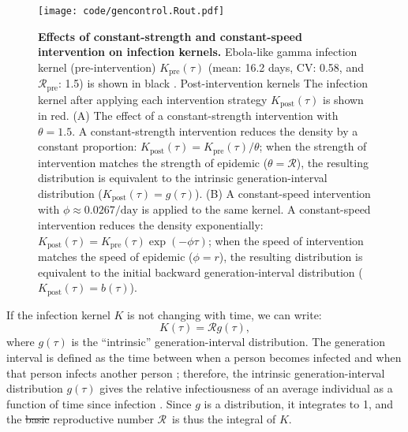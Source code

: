 \documentclass[12pt]{article}
\newcommand{\RR}{\ensuremath{{\mathcal R}}}
\newcommand{\Rx}[1]{\ensuremath{\RR_{\mathrm{#1}}}}
\newcommand{\Rpre}{\Rx{pre}}
\newcommand{\Ro}{\Rx{0}}
\newcommand{\KK}{\ensuremath{{K}}}
\newcommand{\Kx}[1]{\ensuremath{\KK_{\mathrm{#1}}}}
\newcommand{\Kpre}{\Kx{pre}}
\newcommand{\Kpost}{\Kx{post}}
\newcommand{\rr}{\ensuremath{{r}}}
\newcommand{\rx}[1]{\ensuremath{\rr_{\mathrm{#1}}}}
\newcommand{\rpre}{\rx{pre}}
\newcommand{\figlab}[1]{\label{fig:#1}}
\newcommand{\eqlab}[1]{\label{eq:#1}}
\providecommand{\DIFaddtex}[1]{{\protect\color{blue}\uwave{#1}}} %
\providecommand{\DIFdeltex}[1]{{\protect\color{red}\sout{#1}}}                      %
\providecommand{\DIFdelbegin}{} %
\providecommand{\DIFdelend}{} %
\providecommand{\DIFaddFL}[1]{\DIFadd{#1}} %
\providecommand{\DIFdelFL}[1]{\DIFdel{#1}} %
\providecommand{\DIFaddbeginFL}{} %
\providecommand{\DIFaddendFL}{} %
\providecommand{\DIFdelbeginFL}{} %
\providecommand{\DIFdelendFL}{} %
\providecommand{\DIFadd}[1]{\texorpdfstring{\DIFaddtex{#1}}{#1}} %
\providecommand{\DIFdel}[1]{\texorpdfstring{\DIFdeltex{#1}}{}} %
\newcommand{\DIFscaledelfig}{0.5}
\newlength{\DIFdelgraphicswidth} %
\newlength{\DIFdelgraphicsheight} %
\newcommand{\DIFaddincludegraphics}[2][]{{\color{blue}\fbox{\DIFOincludegraphics[#1]{#2}}}} %
\newcommand{\DIFdelincludegraphics}[2][]{%
\sbox{\DIFdelgraphicsbox}{\DIFOincludegraphics[#1]{#2}}%
\settoboxwidth{\DIFdelgraphicswidth}{\DIFdelgraphicsbox} %
\settoboxtotalheight{\DIFdelgraphicsheight}{\DIFdelgraphicsbox} %
\scalebox{\DIFscaledelfig}{%
\parbox[b]{\DIFdelgraphicswidth}{\usebox{\DIFdelgraphicsbox}\\[-\baselineskip] \rule{\DIFdelgraphicswidth}{0em}}\llap{\resizebox{\DIFdelgraphicswidth}{\DIFdelgraphicsheight}{%
\setlength{\unitlength}{\DIFdelgraphicswidth}%
\begin{picture}(1,1)%
\thicklines\linethickness{2pt} %
{\color[rgb]{1,0,0}\put(0,0){\framebox(1,1){}}}%
{\color[rgb]{1,0,0}\put(0,0){\line( 1,1){1}}}%
{\color[rgb]{1,0,0}\put(0,1){\line(1,-1){1}}}%
\end{picture}%
}\hspace*{3pt}}} %
} %
\DeclareRobustCommand{\DIFdelbegin}{\DIFOdelbegin \let\includegraphics\DIFdelincludegraphics} %
\DeclareRobustCommand{\DIFdelend}{\DIFOaddend \let\includegraphics\DIFOincludegraphics} %
\DeclareRobustCommand{\DIFaddbeginFL}{\DIFOaddbeginFL \let\includegraphics\DIFaddincludegraphics} %
\DeclareRobustCommand{\DIFaddendFL}{\DIFOaddendFL \let\includegraphics\DIFOincludegraphics} %
\DeclareRobustCommand{\DIFdelbeginFL}{\DIFOdelbeginFL \let\includegraphics\DIFdelincludegraphics} %
\DeclareRobustCommand{\DIFdelendFL}{\DIFOaddendFL \let\includegraphics\DIFOincludegraphics} %
\begin{document}
\begin{figure}[!t]
\texttt{[image: code/gencontrol.Rout.pdf]}
\caption{
\textbf{Effects of constant-strength and constant-speed intervention on infection kernels.}
Ebola-like gamma infection kernel (pre-intervention) $\Kpre(\tau)$ (mean: 16.2 days, CV: 0.58, and \DIFdelbeginFL %
\DIFdelendFL \DIFaddbeginFL \Rpre\DIFaddendFL : 1.5) is shown in black \citep{park2019practical}.
Post-intervention kernels The infection kernel after applying each intervention strategy $\Kpost(\tau)$ is shown in red.
(A) The effect of a constant-strength intervention with $\theta = 1.5$.
A constant-strength intervention reduces the density by a constant proportion: $\Kpost(\tau) = \Kpre(\tau)/\theta$; when the strength of intervention matches the strength of epidemic (\DIFdelbeginFL \DIFdelFL{$\theta = \RR$}\DIFdelendFL \DIFaddbeginFL \DIFaddFL{$\theta = \Rpre$}\DIFaddendFL ), the resulting distribution is equivalent to the intrinsic generation-interval distribution ($\Kpost(\tau) = g(\tau)$).
(B) A constant-speed intervention with $\phi \approx 0.0267/\mathrm{day}$ is applied to the same kernel.
A constant-speed intervention reduces the density exponentially: $\Kpost(\tau) = \Kpre(\tau) \exp(-\phi \tau)$; when the speed of intervention matches the speed of epidemic (\DIFdelbeginFL \DIFdelFL{$\phi = r$}\DIFdelendFL \DIFaddbeginFL \DIFaddFL{$\phi = \rpre$}\DIFaddendFL ), the resulting distribution is equivalent to the initial backward generation-interval distribution ($\Kpost(\tau) = b(\tau)$). 
}
\figlab{constant}
\end{figure}

If the infection kernel $K$ is not changing with time, we can write:
\begin{equation}
	K(\tau) = \RR g(\tau),
	\eqlab{strengthFactors}
\end{equation}
where $g(\tau)$ is the ``intrinsic'' generation-interval distribution.
The generation interval is defined as the time between when a person becomes infected and when that person infects another person \citep{svensson2007note};
therefore, the intrinsic generation-interval distribution $g(\tau)$ gives the relative infectiousness of an average individual as a function of time since infection \citep{champredon2015intrinsic}. 
Since $g$ is a distribution, it integrates to 1, and the \DIFdelbegin \DIFdel{basic }\DIFdelend reproductive number \RR\ is thus the integral of $K$.
\end{document}
